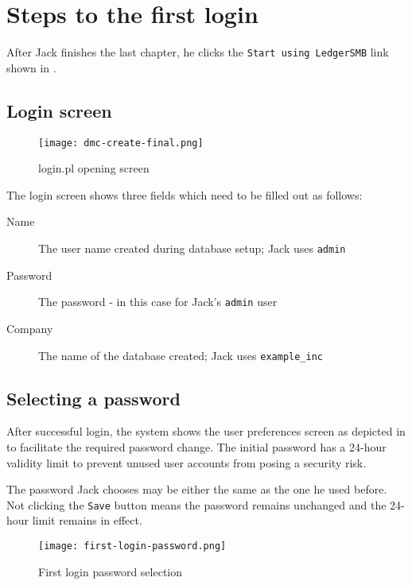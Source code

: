 \section{Steps to the first login}
\label{sec:steps-to-the-first-login}

After Jack finishes the last chapter, he clicks the \texttt{Start using LedgerSMB} link
shown in .


\subsection{Login screen}

\begin{figure}[h]
\texttt{[image: dmc-create-final.png]}
\caption{login.pl opening screen}
\label{fig:login-screen}
\end{figure}

The login screen shows three fields which need to be filled out as follows:

\begin{description}
\item[Name] The user name created during database setup; Jack uses \texttt{admin}
\item[Password] The password - in this case for Jack's \texttt{admin} user
\item[Company] The name of the database created; Jack uses \texttt{example\_inc}
\end{description}

\subsection{Selecting a password}

After successful login, the system shows the user preferences screen as depicted in
 to facilitate the required password change. The
initial password has a 24-hour validity limit to prevent unused user accounts from posing
a security risk.

The password Jack chooses may be either the same as the one he used before.
Not clicking the \texttt{Save} button means the password remains unchanged and the
24-hour limit remains in effect.

\begin{figure}[h]
\centering
\texttt{[image: first-login-password.png]}
\caption{First login password selection}
\label{fig:first-login-password}
\end{figure}

